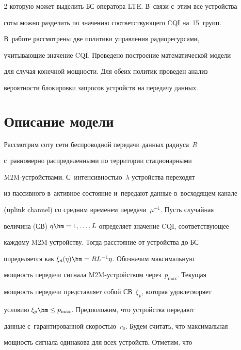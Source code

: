 \begin{multicols}{2}
которую может выделить БС оператора LTE. В~связи с~этим все устройства 


соты можно разделить по значению соответствующего CQI на~15~групп. 





В~работе рассмотрены две политики управления радиоресурсами, 


учитывающие значение CQI. Проведено по\-стро\-ение математической модели 


для случая конечной мощности. Для обеих политик проведен анализ 


вероятности блокировки запросов устройств на передачу данных.


  


\section{Описание модели}





  Рассмотрим соту сети беспроводной передачи данных радиуса~$R$ 


с~равномерно распределенными по территории стационарными  


M2M-устрой\-ст\-ва\-ми. С~интенсивностью~$\lambda$ устройства переходят 


из пассивного в~активное состояние и~передают данные в~восходящем канале 


(uplink channel) со средним временем передачи~$\mu^{-1}$. Пусть случайная 


величина (СВ) $\eta\hm=1,\ldots ,L$ определяет значение CQI, соответствующее 


каждому M2M-устрой\-ст\-ву. Тогда расстояние от устройства до БС 


определяется как $\xi_d(\eta)\hm=RL^{-1}\eta$. Обозначим максимальную 


мощность передачи сигнала M2M-устрой\-ст\-вом через~$p_{\max}$. Текущая 


мощ\-ность передачи пред\-став\-ля\-ет собой СВ~$\xi_p$, которая удовлетворяет 


условию $\xi_p\hm\leq p_{\max}$. Предположим, что устройства передают 


данные с~гарантированной скоростью~$r_0$. Будем считать, что максимальная 


мощность сигнала одинакова для всех устройств. Отметим, что 



\end{multicols}
